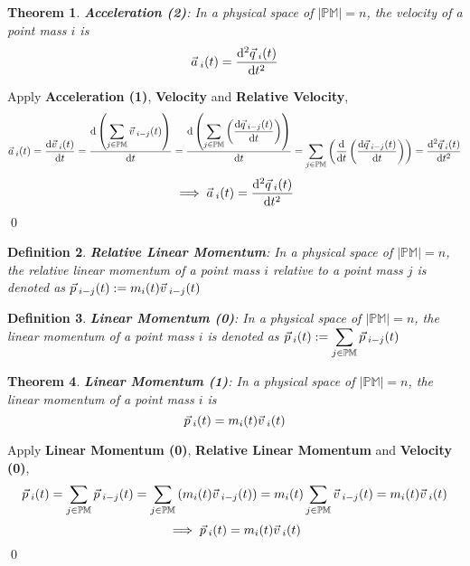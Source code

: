 \documentclass[12pt]{amsart}
\newtheorem{theorem}{Theorem}[section]
\newtheorem{definition}[theorem]{Definition}
\renewenvironment{proof}{{\bfseries Proof.}}{\qed}
\let\oldvec\vec
\renewcommand{\vec}[1]{\oldvec{#1}\hspace{0.1em}}
\begin{document}
\begin{theorem}
\textbf{Acceleration (2)}: In a physical space of $\left | \mathbb{PM} \right | = n$, the velocity of a point mass $i$ is $$\vec{a}_i(t) = \dfrac{\mathrm{d}^2 \vec{q}_{i} (t)}{\mathrm{d} t^2}$$
\end{theorem}

\begin{proof}
    Apply \textbf{Acceleration (1)}, \textbf{Velocity} and \textbf{Relative Velocity},
    \begin{align*}
    \vec{a}_i (t) = \dfrac{\mathrm{d} \vec{v}_{i} (t)}{\mathrm{d} t} = \dfrac{\mathrm{d} \left ( \displaystyle \sum_{j \in \mathbb{PM}} \vec{v}_{i-j}(t) \right )}{\mathrm{d} t} = \dfrac{\mathrm{d} \left ( \displaystyle \sum_{j \in \mathbb{PM}} \left ( \dfrac{\mathrm{d} \vec{q}_{i-j}(t)}{\mathrm{d} t} \right ) \right )}{\mathrm{d} t} = \displaystyle \sum_{j \in \mathbb{PM}} \left ( \dfrac{\mathrm{d} }{\mathrm{d} t} \left ( \dfrac{\mathrm{d}  \vec{q}_{i-j}(t) }{\mathrm{d} t} \right ) \right ) = \dfrac{\mathrm{d}^2 \vec{q}_{i} (t)}{\mathrm{d} t^2}
    \end{align*}
    $$\implies \vec{a}_i(t) = \dfrac{\mathrm{d}^2 \vec{q}_{i} (t)}{\mathrm{d} t^2} $$
\end{proof}

\begin{definition}
\textbf{Relative Linear Momentum}: In a physical space of $\left | \mathbb{PM} \right | = n$, the relative linear momentum of a point mass $i$ relative to a point mass $j$ is denoted as $\vec{p}_{i-j} (t) := m_i (t)\vec{v}_{i-j} (t)$ 
\end{definition}

\begin{definition}
\textbf{Linear Momentum (0)}: In a physical space of $\left | \mathbb{PM} \right | = n$, the linear momentum of a point mass $i$ is denoted as $\vec{p}_i(t) := \displaystyle \sum_{j \in \mathbb{PM}} \vec{p}_{i-j} (t)$ 
\end{definition}
 
\begin{theorem}
    \textbf{Linear Momentum (1)}: In a physical space of $\left | \mathbb{PM} \right | = n$, the linear momentum of a point mass $i$ is
    $$\vec{p}_i(t) =  m_i (t)\vec{v}_{i}(t)$$
\end{theorem}

\begin{proof}
    Apply \textbf{Linear Momentum (0)}, \textbf{Relative Linear Momentum} and \textbf{Velocity (0)},
    $$\vec{p}_i(t) =  \displaystyle \sum_{j \in \mathbb{PM}} \vec{p}_{i-j} (t) = \displaystyle \sum_{j \in \mathbb{PM}} \left ( m_i (t)\vec{v}_{i-j} (t) \right ) =  m_i (t) \displaystyle \sum_{j \in \mathbb{PM}} \vec{v}_{i-j} (t) = m_i (t) \vec{v}_i(t) $$
    $$\implies \vec{p}_i(t) = m_i (t)\vec{v}_i(t)$$
\end{proof}
\end{document}
